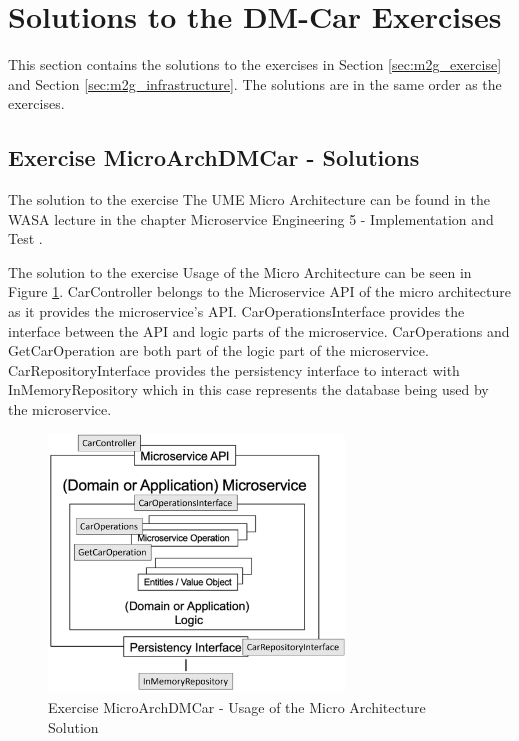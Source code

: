 \section{Solutions to the DM-Car Exercises}
\label{sec:m2g_solutions}

This section contains the solutions to the exercises in Section \ref{sec:m2g_exercise}
and Section \ref{sec:m2g_infrastructure}. The solutions are in the same order as the exercises.

\subsection*{Exercise MicroArchDMCar - Solutions}

The solution to the exercise The UME Micro Architecture can be found in the WASA lecture in the
chapter Microservice Engineering 5 - Implementation and Test \cite{CM-W-IMP}.

The solution to the exercise Usage of the Micro Architecture can be seen in Figure \ref{fig:m2go_solution_1_2}.
CarController belongs to the Microservice API of the micro architecture as it provides the microservice's API.
CarOperationsInterface provides the interface between the API and logic parts of the microservice.
CarOperations and GetCarOperation are both part of the logic part of the microservice.
CarRepositoryInterface provides the persistency interface to interact with InMemoryRepository
which in this case represents the database being used by the microservice.

\begin{figure}[tb]
	\centering
	\includegraphics[width=0.7\textwidth]{figures/m2go_solution_1_2.png}
	\caption{Exercise MicroArchDMCar - Usage of the Micro Architecture Solution}
	\label{fig:m2go_solution_1_2}
\end{figure}

